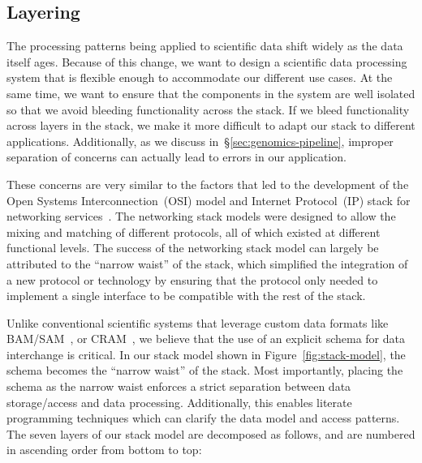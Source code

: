 \documentclass{acm_proc_article-sp}
\begin{document}
\subsection{Layering}
\label{sec:layering}

The processing patterns being applied to scientific data shift widely
as the data itself ages. Because of this change, we want to design a scientific data processing system that is
flexible enough to accommodate our different use cases. At the same time, we want to ensure that the
components in the system are well isolated so that we avoid bleeding functionality across the stack. If
we bleed functionality across layers in the stack, we make it more difficult to adapt our stack to different
applications. Additionally, as we discuss in~\S\ref{sec:genomics-pipeline}, improper separation of
concerns can actually lead to errors in our application.

These concerns are very similar to the factors that led to the development of the Open Systems
Interconnection~(OSI) model and Internet Protocol~(IP) stack for networking
services~\cite{zimmermann80}. The networking stack models were designed to allow the mixing and
matching of different protocols, all of which existed at different functional levels. The success of the
networking stack model can largely be attributed to the ``narrow waist'' of the stack, which simplified the
integration of a new protocol or technology by ensuring that the protocol only needed to implement a
single interface to be compatible with the rest of the stack.

Unlike conventional scientific systems that leverage custom data formats like BAM/SAM~\cite{li09},
or CRAM~\cite{fritz11}, we believe that the use of an explicit schema for data interchange is critical.
In our stack model shown in Figure~\ref{fig:stack-model}, the schema becomes the ``narrow waist''
of the stack. Most importantly, placing the schema as the narrow waist enforces a strict separation
between data storage/access and data processing. Additionally, this enables literate programming
techniques which can clarify the data model and access patterns. The seven layers of our stack model
are decomposed as follows, and are numbered in ascending order from bottom to top:
\end{document}
